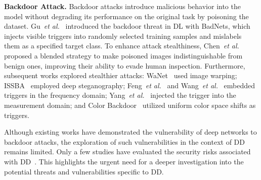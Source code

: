 \noindent \textbf{Backdoor Attack.} Backdoor attacks introduce malicious behavior into the model without degrading its performance on the original task by poisoning the dataset. Gu~\textit{et al.}~\cite{gu2019badnets} introduced the backdoor threat in DL with BadNets, which injects visible triggers into randomly selected training samples and mislabels them as a specified target class. To enhance attack stealthiness, Chen~\textit{et al.}~\cite{chen2017targeted} proposed a blended strategy to make poisoned images indistinguishable from benign ones, improving their ability to evade human inspection. Furthermore, subsequent works explored stealthier attacks: WaNet~\cite{nguyen2020wanet} used image warping; ISSBA~\cite{li2021invisible} employed deep steganography; Feng~\textit{et al.}~\cite{feng2022fiba} and Wang~\textit{et al.}~\cite{wang2022invisible} embedded triggers in the frequency domain; Yang~\textit{et al.}~\cite{yang2024inject} injected the trigger into the measurement domain; and Color Backdoor~\cite{jiang2023color} utilized uniform color space shifts as triggers. 

Although existing works have demonstrated the vulnerability of deep networks to backdoor attacks, the exploration of such vulnerabilities in the context of DD remains limited. Only a few studies have evaluated the security risks associated with DD~\cite{liu2023backdoor,chung2024rethinking}. This highlights the urgent need for a deeper investigation into the potential threats and vulnerabilities specific to DD. 

%